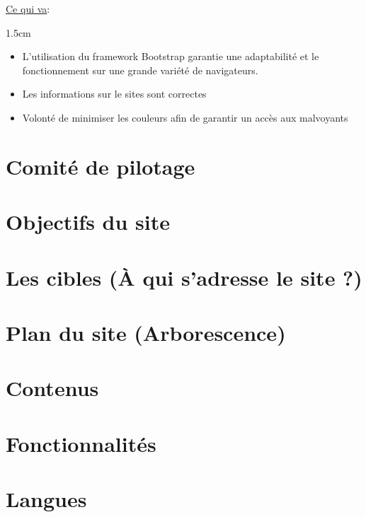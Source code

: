 \documentclass[oneside]{report}
\newcommand{\indentunder}{1.5cm}
\begin{document}
{	\par\underline{Ce qui va}:
		\vspace{.5cm}
		\begin{adjustwidth}{\indentunder}{}
		\begin{itemize}
			\item L'utilisation du framework Bootstrap garantie une adaptabilité et le fonctionnement sur une grande variété de navigateurs.
			\item Les informations sur le sites sont correctes
			\item Volonté de minimiser les couleurs afin de garantir un accès aux malvoyants
		\end{itemize}
		\end{adjustwidth}
	
		\section{Comité de pilotage}
		\section{Objectifs du site}
		\section{Les cibles (À qui s'adresse le site ?)}
		\section{Plan du site (Arborescence)}
		\section{Contenus}
		\section{Fonctionnalités}
		\section{Langues}
	}
\end{document}
